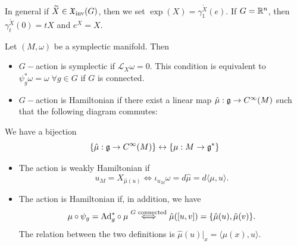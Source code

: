 In general if $\widetilde{X}\in\mathfrak{X}_{\text{inv}}(G)$, then we set $\exp(X)=\gamma_1^{\widetilde{X}}(e)$. If $G=\mathbb{R}^n$, then 
$\gamma_t^{\widetilde{X}}(0)=tX$ and $e^X=X$.


    Let $(M,\omega)$ be a symplectic manifold. Then

    \begin{itemize}
        \item $G-$action is symplectic if $\mathcal{L}_X\omega = 0$. This condition is equivalent to 
        $\psi_g^*\omega=\omega\;\forall g\in G$ if $G$ is connected.
        \item $G-$action is Hamiltonian if there exist a linear map $\hat{\mu}:\mathfrak{g}\to C^\infty(M)$
        such that the following diagram commutes: 
        \begin{center}
        \end{center}
    \end{itemize}

    \begin{remark}
        We have a bijection 
        \begin{equation}
            \{\hat{\mu}: \mathfrak{g}\to C^\infty(M)\} \leftrightarrow \{\mu:M\to\mathfrak{g}^*\}
        \end{equation}
    \end{remark}

\begin{itemize}
    \item The action is weakly Hamiltonian if
    \begin{equation}
        u_M = X_{\hat{\mu}(u)} \iff \iota_{u_M}\omega = d\hat{\mu} = d\langle\mu,u\rangle.
    \end{equation}
    \item The action is Hamiltonian if, in addition, we have 
    \begin{equation}
        \mu \circ \psi_g = \text{Ad}_g^*\circ\mu \overset{G\text{ connected}}{\iff} \hat{\mu}([u,v])=\{\hat{\mu}(u),\hat{\mu}(v)\}.
    \end{equation}
    The relation between the two definitions is $\hat{\mu}(u)\big|_x = \langle\mu(x),u\rangle$.
\end{itemize}

